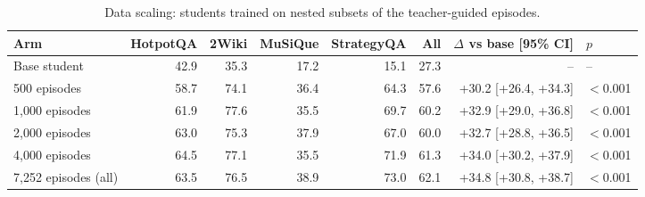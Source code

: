 \begin{table}[t]
\centering
\small
\caption{Data scaling: students trained on nested subsets of the teacher-guided episodes.}
\label{fig:E04-scaling}
\begin{tabular}{lrrrrrrl}
\toprule
Arm & HotpotQA & 2Wiki & MuSiQue & StrategyQA & All & $\Delta$ vs base [95\% CI] & $p$ \\
\midrule
Base student & 42.9 & 35.3 & 17.2 & 15.1 & 27.3 & -- & -- \\
500 episodes & 58.7 & 74.1 & 36.4 & 64.3 & 57.6 & +30.2 [+26.4, +34.3] & $<$0.001 \\
1,000 episodes & 61.9 & 77.6 & 35.5 & 69.7 & 60.2 & +32.9 [+29.0, +36.8] & $<$0.001 \\
2,000 episodes & 63.0 & 75.3 & 37.9 & 67.0 & 60.0 & +32.7 [+28.8, +36.5] & $<$0.001 \\
4,000 episodes & 64.5 & 77.1 & 35.5 & 71.9 & 61.3 & +34.0 [+30.2, +37.9] & $<$0.001 \\
7,252 episodes (all) & 63.5 & 76.5 & 38.9 & 73.0 & 62.1 & +34.8 [+30.8, +38.7] & $<$0.001 \\
\bottomrule
\end{tabular}
\end{table}

